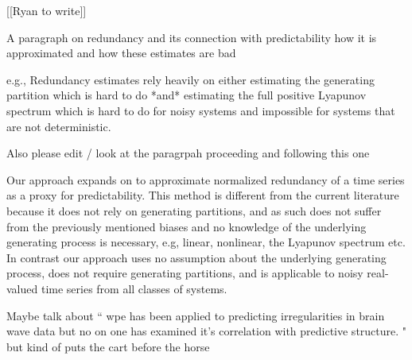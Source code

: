 {\color{red}[[Ryan to write]]

A paragraph on redundancy and its connection with predictability  how it is approximated and how these estimates are bad 

e.g., Redundancy estimates rely heavily on either estimating the generating partition which is hard to do *and* estimating the full positive Lyapunov spectrum which is hard to do for noisy systems and impossible for systems that are not deterministic.



Also please edit / look at the paragrpah proceeding and following this one
}

Our approach expands on \cite{bandt2002per} to approximate normalized redundancy of a time series as a proxy for predictability. This method is different from the current literature because it does not rely on generating partitions, and as such does not suffer from the previously mentioned biases and no knowledge of the underlying generating process is necessary, e.g, linear, nonlinear, the Lyapunov spectrum etc.  In contrast our approach uses no assumption about the underlying generating process, does not require generating partitions, and is applicable to noisy real-valued time series from all classes of systems.

{\color{red}
Maybe talk about ``
wpe has been applied to predicting irregularities in brain wave data but no on one has examined it's correlation with predictive structure. "
but kind of puts the cart before the horse
}

